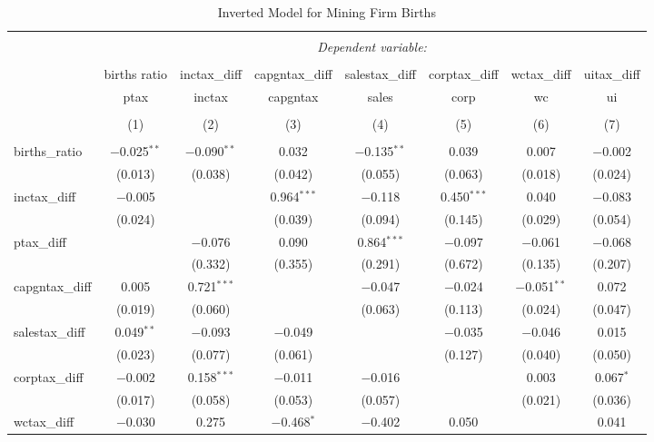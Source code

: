 
\begin{table}[!htbp] \centering 
  \caption{Inverted Model for  Mining Firm Births} 
  \label{21rd} 
\footnotesize 
\begin{tabular}{@{\extracolsep{5pt}}lccccccc} 
\\[-1.8ex]\hline 
\hline \\[-1.8ex] 
 & \multicolumn{7}{c}{\textit{Dependent variable:}} \\ 
\cline{2-8} 
\\[-1.8ex] & births ratio & inctax\_diff & capgntax\_diff & salestax\_diff & corptax\_diff & wctax\_diff & uitax\_diff \\ 
 & ptax & inctax & capgntax & sales & corp & wc & ui \\ 
\\[-1.8ex] & (1) & (2) & (3) & (4) & (5) & (6) & (7)\\ 
\hline \\[-1.8ex] 
 births\_ratio & $-$0.025$^{**}$ & $-$0.090$^{**}$ & 0.032 & $-$0.135$^{**}$ & 0.039 & 0.007 & $-$0.002 \\ 
  & (0.013) & (0.038) & (0.042) & (0.055) & (0.063) & (0.018) & (0.024) \\ 
  inctax\_diff & $-$0.005 &  & 0.964$^{***}$ & $-$0.118 & 0.450$^{***}$ & 0.040 & $-$0.083 \\ 
  & (0.024) &  & (0.039) & (0.094) & (0.145) & (0.029) & (0.054) \\ 
  ptax\_diff &  & $-$0.076 & 0.090 & 0.864$^{***}$ & $-$0.097 & $-$0.061 & $-$0.068 \\ 
  &  & (0.332) & (0.355) & (0.291) & (0.672) & (0.135) & (0.207) \\ 
  capgntax\_diff & 0.005 & 0.721$^{***}$ &  & $-$0.047 & $-$0.024 & $-$0.051$^{**}$ & 0.072 \\ 
  & (0.019) & (0.060) &  & (0.063) & (0.113) & (0.024) & (0.047) \\ 
  salestax\_diff & 0.049$^{**}$ & $-$0.093 & $-$0.049 &  & $-$0.035 & $-$0.046 & 0.015 \\ 
  & (0.023) & (0.077) & (0.061) &  & (0.127) & (0.040) & (0.050) \\ 
  corptax\_diff & $-$0.002 & 0.158$^{***}$ & $-$0.011 & $-$0.016 &  & 0.003 & 0.067$^{*}$ \\ 
  & (0.017) & (0.058) & (0.053) & (0.057) &  & (0.021) & (0.036) \\ 
  wctax\_diff & $-$0.030 & 0.275 & $-$0.468$^{*}$ & $-$0.402 & 0.050 &  & 0.041 \\ 

\end{tabular}
\end{table}
